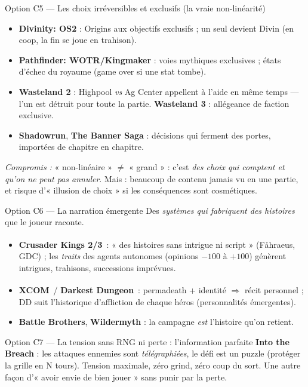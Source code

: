 \documentclass[11pt,a4paper]{article}
\newcommand{\dv}{\,\textsuperscript{\textcolor{accent2}{\textdagger}}}
\newcommand{\jeu}[1]{\textbf{#1}}
\newcommand{\compromis}[1]{\par\smallskip\textit{\textcolor{warn}{Compromis :}} #1}
\begin{document}
\begin{optionbox}{Option C5 --- Les choix irréversibles et exclusifs (la vraie non-linéarité)}
\begin{itemize}
\item \jeu{Divinity: OS2} : Origins aux objectifs exclusifs ; un seul devient Divin (en coop, la fin se joue en trahison).
\item \jeu{Pathfinder: WOTR/Kingmaker} : voies mythiques exclusives ; états d'échec du royaume (game over si une stat tombe).
\item \jeu{Wasteland 2} : Highpool \emph{vs} Ag Center appellent à l'aide en même temps — l'un est détruit pour toute la partie. \jeu{Wasteland 3} : allégeance de faction exclusive.
\item \jeu{Shadowrun}, \jeu{The Banner Saga} : décisions qui ferment des portes, importées de chapitre en chapitre.
\end{itemize}
\compromis{« non-linéaire » $\neq$ « grand » : c'est \emph{des choix qui comptent et qu'on ne peut pas annuler}. Mais : beaucoup de contenu jamais vu en une partie, et risque d'« illusion de choix » si les conséquences sont cosmétiques.}
\end{optionbox}

\begin{optionbox}{Option C6 --- La narration émergente}
Des \emph{systèmes qui fabriquent des histoires} que le joueur raconte.
\begin{itemize}
\item \jeu{Crusader Kings 2/3}\dv{} : « des histoires sans intrigue ni script » (Fåhraeus, GDC) ; les \emph{traits} des agents autonomes (opinions $-100$ à $+100$) génèrent intrigues, trahisons, successions imprévues.
\item \jeu{XCOM}\dv{} / \jeu{Darkest Dungeon}\dv{} : permadeath + identité $\Rightarrow$ récit personnel ; DD suit l'historique d'affliction de chaque héros (personnalités émergentes).
\item \jeu{Battle Brothers}, \jeu{Wildermyth} : la campagne \emph{est} l'histoire qu'on retient.
\end{itemize}
\end{optionbox}

\begin{optionbox}{Option C7 --- La tension sans RNG ni perte : l'information parfaite}
\jeu{Into the Breach} : les attaques ennemies sont \emph{télégraphiées}, le défi est un puzzle (protéger la grille en N tours). Tension maximale, zéro grind, zéro coup du sort. Une autre façon d'« avoir envie de bien jouer » sans punir par la perte.
\end{optionbox}
\end{document}
